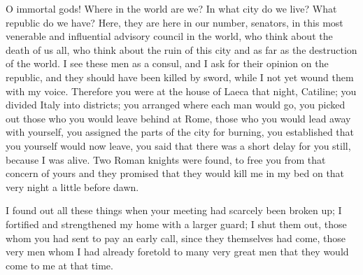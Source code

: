 {  O immortal gods! Where in the world are we? In what city do we live? What republic do we have? Here, they are here in our number, senators, in this most venerable and influential advisory council in the world, who think about the death of us all, who think about the ruin of this city and as far as the destruction of the world. I see these men as a consul, and I ask for their opinion on the republic, and they should have been killed by sword, while I not yet wound them with my voice. Therefore you were at the house of Laeca that night, Catiline; you divided Italy into districts; you arranged where each man would go, you picked out those who you would leave behind at Rome, those who you would lead away with yourself, you assigned the parts of the city for burning, you established that you yourself would now leave, you said that there was a short delay for you still, because I was alive. Two Roman knights were found, to free you from that concern of yours and they promised that they would kill me in my bed on that very night a little before dawn. 

  I found out all these things when your meeting had scarcely been broken up; I fortified and strengthened my home with a larger guard; I shut them out, those whom you had sent to pay an early call, since they themselves had come, those very men whom I had already foretold to many very great men that they would come to me at that time.
}
